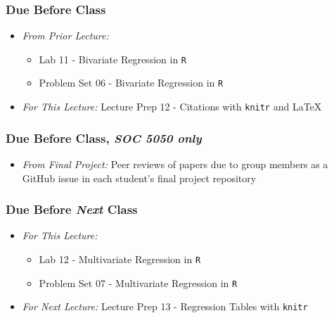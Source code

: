 \documentclass[]{book}
\providecommand{\tightlist}{%
  \setlength{\itemsep}{0pt}\setlength{\parskip}{0pt}}
\theoremstyle{definition}
\theoremstyle{definition}
\theoremstyle{definition}
\theoremstyle{remark}
\begin{document}
\hypertarget{due-before-class-12}{%
\subsubsection*{Due Before Class}\label{due-before-class-12}}

\begin{itemize}
\tightlist
\item
  \emph{From Prior Lecture:}

  \begin{itemize}
  \tightlist
  \item
    Lab 11 - Bivariate Regression in \texttt{R}
  \item
    Problem Set 06 - Bivariate Regression in \texttt{R}
  \end{itemize}
\item
  \emph{For This Lecture:} Lecture Prep 12 - Citations with
  \texttt{knitr} and LaTeX
\end{itemize}

\hypertarget{due-before-class-soc-5050-only-2}{%
\subsubsection*{\texorpdfstring{Due Before Class, \emph{SOC 5050
only}}{Due Before Class, SOC 5050 only}}\label{due-before-class-soc-5050-only-2}}

\begin{itemize}
\tightlist
\item
  \emph{From Final Project:} Peer reviews of papers due to group members
  as a GitHub issue in each student's final project repository
\end{itemize}

\hypertarget{due-before-next-class-12}{%
\subsubsection*{\texorpdfstring{Due Before \emph{Next}
Class}{Due Before Next Class}}\label{due-before-next-class-12}}

\begin{itemize}
\tightlist
\item
  \emph{For This Lecture:}

  \begin{itemize}
  \tightlist
  \item
    Lab 12 - Multivariate Regression in \texttt{R}
  \item
    Problem Set 07 - Multivariate Regression in \texttt{R}
  \end{itemize}
\item
  \emph{For Next Lecture:} Lecture Prep 13 - Regression Tables with
  \texttt{knitr}
\end{itemize}
\end{document}

